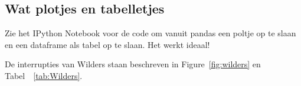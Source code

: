 \pagebreak
\subsection{Wat plotjes en tabelletjes}

Zie het IPython Notebook voor de code om vanuit pandas een poltje op te slaan en een dataframe als tabel op te slaan. Het werkt ideaal! 

De interrupties van Wilders staan beschreven in Figure~\ref{fig:wilders} en Tabel~~\ref{tab:Wilders}.





\pagebreak

%


\pagebreak
